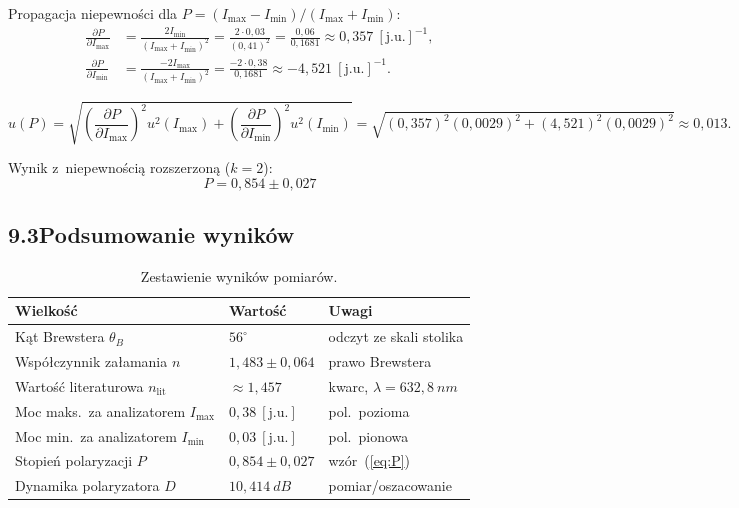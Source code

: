\documentclass[a4paper,12pt]{article}
\begin{document}
Propagacja niepewności dla $P = (I_{\max} - I_{\min})/(I_{\max} + I_{\min})$:
\begin{align*}
  \frac{\partial P}{\partial I_{\max}}
    &= \frac{2I_{\min}}{(I_{\max}+I_{\min})^2}
     = \frac{2 \cdot 0{,}03}{(0{,}41)^2}
     = \frac{0{,}06}{0{,}1681}
     \approx 0{,}357\ [\text{j.u.}]^{-1}, \\
  \frac{\partial P}{\partial I_{\min}}
    &= \frac{-2I_{\max}}{(I_{\max}+I_{\min})^2}
     = \frac{-2 \cdot 0{,}38}{0{,}1681}
     \approx -4{,}521\ [\text{j.u.}]^{-1}.
\end{align*}

\[
  u(P) = \sqrt{\left(\frac{\partial P}{\partial I_{\max}}\right)^{\!2}
               u^2(I_{\max})
              +\left(\frac{\partial P}{\partial I_{\min}}\right)^{\!2}
               u^2(I_{\min})}
       = \sqrt{(0{,}357)^2(0{,}0029)^2 + (4{,}521)^2(0{,}0029)^2}
       \approx 0{,}013.
\]

Wynik z~niepewnością rozszerzoną ($k = 2$):
\[
  \boxed{P = 0{,}854 \pm 0{,}027}
\]

\subsection*{9.3\quad Podsumowanie wyników}

\begin{table}[H]
\centering
\caption{Zestawienie wyników pomiarów.}
\label{tab:wyniki}
\renewcommand{\arraystretch}{1.3}
\begin{tabular}{lll}
\toprule
Wielkość & Wartość & Uwagi \\
\midrule
Kąt Brewstera $\theta_B$ & $56^\circ$ & odczyt ze skali stolika \\
Współczynnik załamania $n$ & $1{,}483 \pm 0{,}064$ & prawo Brewstera \\
Wartość literaturowa $n_{\text{lit}}$ & $\approx 1{,}457$ & kwarc, $\lambda = 632{,}8\ \si{nm}$ \\
\midrule
Moc maks.\ za analizatorem $I_{\max}$ & $0{,}38\ [\text{j.u.}]$ & pol.\ pozioma \\
Moc min.\ za analizatorem $I_{\min}$ & $0{,}03\ [\text{j.u.}]$ & pol.\ pionowa \\
Stopień polaryzacji $P$ & $0{,}854 \pm 0{,}027$ & wzór~(\ref{eq:P}) \\
Dynamika polaryzatora $D$ & $10{,}414\ \si{dB}$ & pomiar/oszacowanie \\
\bottomrule
\end{tabular}
\end{table}
\end{document}

